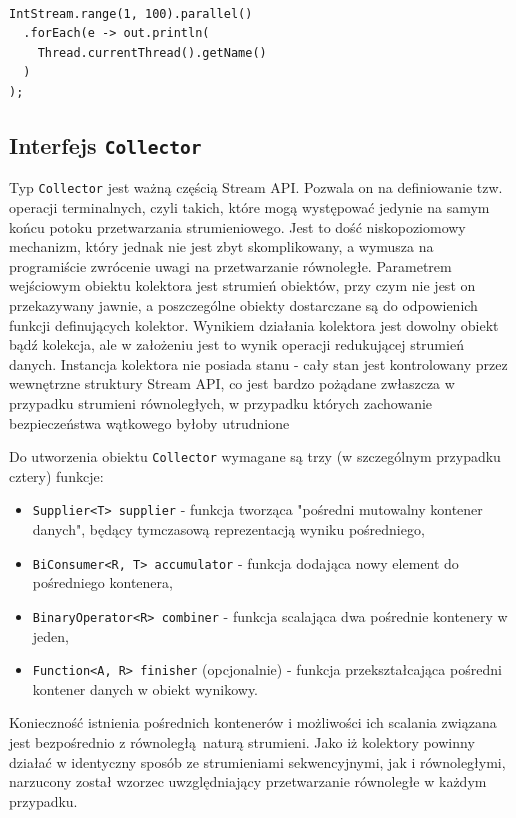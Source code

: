 \documentclass[12pt]{extarticle}
\begin{document}
\begin{lstlisting}[label=streamsthreads, caption=Struktura puli wątków FJP]

IntStream.range(1, 100).parallel()
  .forEach(e -> out.println(
    Thread.currentThread().getName()
  )
);

\end{lstlisting}

\subsection{Interfejs \texttt{Collector}}

    Typ \texttt{Collector} jest ważną częścią Stream API. Pozwala on na definiowanie tzw. operacji terminalnych, czyli takich, które mogą występować jedynie na samym końcu potoku przetwarzania strumieniowego. Jest to dość niskopoziomowy mechanizm, który jednak nie jest zbyt skomplikowany, a wymusza na programiście zwrócenie uwagi na przetwarzanie równoległe. Parametrem wejściowym obiektu kolektora jest strumień obiektów, przy czym nie jest on przekazywany jawnie, a poszczególne obiekty dostarczane są do odpowienich funkcji definujących kolektor. Wynikiem działania kolektora jest dowolny obiekt bądź kolekcja, ale w założeniu jest to wynik operacji redukującej strumień danych. Instancja kolektora nie posiada stanu - cały stan jest kontrolowany przez wewnętrzne struktury Stream API, co jest bardzo pożądane zwłaszcza w przypadku strumieni równoległych, w przypadku których zachowanie bezpieczeństwa wątkowego byłoby utrudnione

    Do utworzenia obiektu \texttt{Collector} wymagane są trzy (w szczególnym przypadku cztery) funkcje:

\begin{itemize}
    \item \texttt{Supplier<T> supplier} - funkcja tworząca "pośredni mutowalny kontener danych", będący tymczasową reprezentacją wyniku pośredniego,
    \item \texttt{BiConsumer<R, T> accumulator} - funkcja dodająca nowy element do pośredniego kontenera,
    \item \texttt{BinaryOperator<R> combiner} - funkcja scalająca dwa pośrednie kontenery w jeden,
    \item \texttt{Function<A, R> finisher} (opcjonalnie) - funkcja przekształcająca pośredni kontener danych w obiekt wynikowy.
\end{itemize}

    Konieczność istnienia pośrednich kontenerów i możliwości ich scalania związana jest bezpośrednio z równoległą naturą strumieni. Jako iż kolektory powinny działać w identyczny sposób ze strumieniami sekwencyjnymi, jak i równoległymi, narzucony został wzorzec uwzględniający przetwarzanie równoległe w każdym przypadku.
\end{document}

